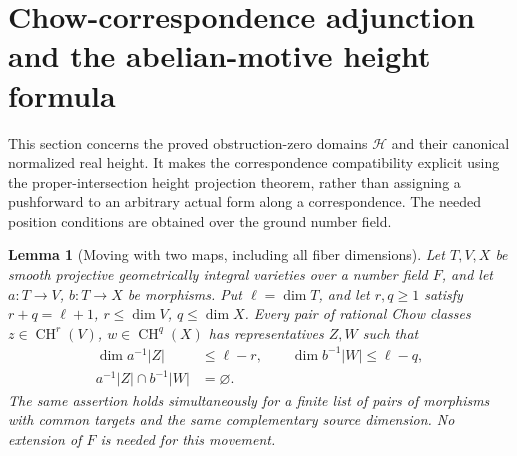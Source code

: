 \documentclass[11pt,a4paper]{article}
\newtheorem{lemma}[theorem]{Lemma}
\theoremstyle{definition}
\theoremstyle{remark}
\numberwithin{equation}{section}
\begin{document}
\section[Correspondence adjunction and the abelian-motive height formula]{Chow-correspondence adjunction and the abelian-motive height formula}
\label{r16ha:section}

This section concerns the proved obstruction-zero domains
$\mathcal H$ and their canonical normalized real height. It makes
the correspondence compatibility explicit using the proper-intersection
height projection theorem, rather than assigning a pushforward to an
arbitrary actual form along a correspondence. The needed position
conditions are obtained over the ground number field.

\begin{lemma}[Moving with two maps, including all fiber dimensions]
\label{r16ha:moving}
Let $T,V,X$ be smooth projective geometrically integral varieties
over a number field $F$, and let $a:T\to V$, $b:T\to X$ be
morphisms. Put $\ell=\dim T$, and let $r,q\geq1$ satisfy
$r+q=\ell+1$, $r\leq\dim V$, $q\leq\dim X$.
Every pair of rational Chow classes $z\in\operatorname{CH}^r(V)$,
$w\in\operatorname{CH}^q(X)$ has representatives $Z,W$ such that
\[
 \begin{split}
 \dim a^{-1}|Z|&\leq\ell-r,\qquad
 \dim b^{-1}|W|\leq\ell-q,\\
 a^{-1}|Z|\cap b^{-1}|W|&=\varnothing.
 \end{split}
 \tag{HA16.1}\label{r16ha:position}
\]
The same assertion holds simultaneously for a finite list of pairs
of morphisms with common targets and the same complementary
source dimension. No extension of $F$ is needed for this movement.
\end{lemma}
\end{document}
